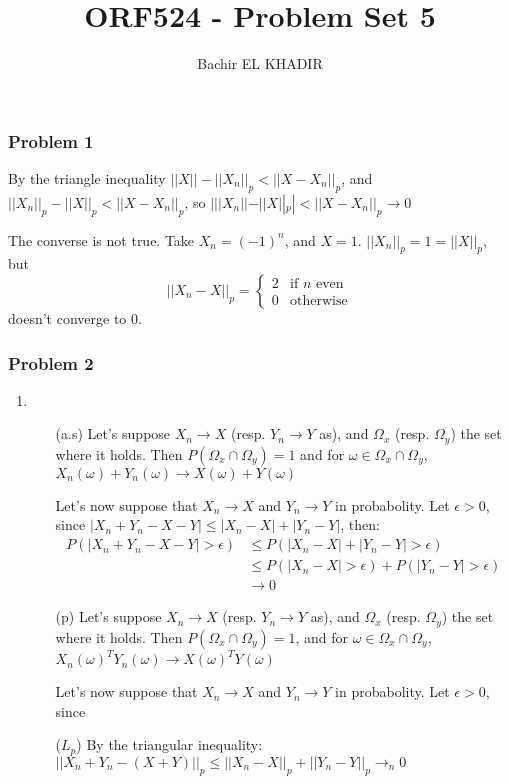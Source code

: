 \documentclass[12pt]{article}
\title{ORF524 - Problem Set 5}
\author{Bachir EL KHADIR }
\newcommand{\Q}[1]{\subsubsection*{Problem #1}}
\begin{document}
\maketitle

\Q{1}
By the triangle inequality
$||X|| - ||X_n||_p < ||X - X_n||_p$, and $||X_n||_p - ||X||_p < ||X - X_n||_p$, so $|||X_n|| - ||X||_p| < ||X - X_n||_p \rightarrow 0$

The converse is not true. Take $X_n = (-1)^n$, and $X = 1$.
$||X_n||_p = 1 = ||X||_p$, but
\[||X_n - X||_p = \left\{ \begin{array}{cc}2 & \text{if $n$ even}\\ 0 &\text{otherwise} \end{array} \right.\]
doesn't converge to 0.

\Q{2}

\begin{enumerate}
\item
  \begin{itemize}
  \item[(a.s)] Let's suppose $X_n \rightarrow X$ (resp.
    $Y_n \rightarrow Y$ as), and $\Omega_x$ (resp. $\Omega_y$) the set
    where it holds.  Then $P(\Omega_x \cap \Omega_y) = 1$ and for
    $\omega \in \Omega_x \cap \Omega_y$,
    $X_n(\omega) + Y_n(\omega) \rightarrow X(\omega) + Y(\omega)$

    Let's now suppose that $X_n \rightarrow X$ and $Y_n \rightarrow Y$
    in probabolity. Let $\epsilon > 0$, since
    $|X_n + Y_n - X - Y| \le |X_n - X| + |Y_n - Y|$, then:
    \begin{align*}
      P(|X_n + Y_n - X - Y| > \epsilon)
      &\le P(|X_n - X|+ | Y_n - Y| > \epsilon)
      \\&\le P(|X_n - X| > \epsilon) + P(| Y_n - Y| > \epsilon)
      \\& \rightarrow 0
    \end{align*}
  \item [(p)] Let's suppose $X_n \rightarrow X$ (resp.
    $Y_n \rightarrow Y$ as), and $\Omega_x$ (resp. $\Omega_y$) the set
    where it holds.  Then $P(\Omega_x \cap \Omega_y) = 1$, and for
    $\omega \in \Omega_x \cap \Omega_y$,
    $X_n(\omega)^T Y_n(\omega) \rightarrow X(\omega)^TY(\omega)$
  
    Let's now suppose that $X_n \rightarrow X$ and $Y_n \rightarrow Y$
    in probabolity. Let $\epsilon > 0$, since
  \item[($L_p$)] By the triangular inequality: $||X_n + Y_n - (X + Y)||_p \le ||X_n - X||_p + ||Y_n - Y||_p \rightarrow_n 0$
  \end{itemize}


\end{enumerate}
\end{document}
